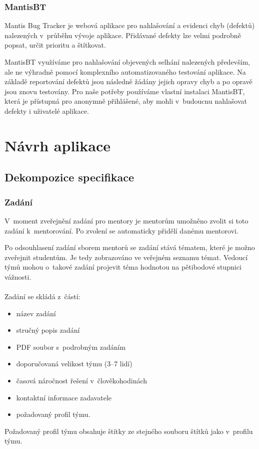 \documentclass[czech,BP]{thesiskiv}
\begin{document}
\subsection{MantisBT}
	\par Mantis Bug Tracker je webová aplikace pro nahlašování a evidenci chyb (defektů) nalezených v~průběhu vývoje aplikace. Přidávané defekty lze velmi podrobně popsat, určit prioritu a štítkovat.
	\par MantisBT využíváme pro nahlašování objevených selhání nalezených především, ale ne výhradně pomocí komplexního automatizovaného testování aplikace. Na základě reportování defektů jsou následně žádány jejich opravy chyb a po opravě jsou znovu testovány. Pro naše potřeby používáme vlastní instalaci MantisBT, která je přístupná pro anonymně přihlášené, aby mohli v~budoucnu nahlašovat defekty i uživatelé aplikace.
\chapter{Návrh aplikace}

	\section{Dekompozice specifikace}
		\subsection{Zadání}
		\par V~moment zveřejnění zadání pro mentory je mentorům umožněno zvolit si toto zadání k~mentorování. Po zvolení se automaticky přidělí danému mentorovi.
		\par Po odsouhlasení zadání sborem mentorů se zadání stává tématem, které je možno zveřejnit studentům. Je tedy zobrazováno ve veřejném seznamu témat. Vedoucí týmů mohou o~takové zadání projevit téma hodnotou na pětibodové stupnici vážnosti.\\\\
		Zadání se skládá z~částí:
		\begin{itemize}
			\item název zadání
			\item stručný popis zadání
			\item PDF soubor s~podrobným zadáním
			\item doporučovaná velikost týmu (3--7 lidí)
			\item časová náročnost řešení v~člověkohodinách
			\item kontaktní informace zadavatele
			\item požadovaný profil týmu.
		\end{itemize}
		\par Požadovaný profil týmu obsahuje štítky ze stejného souboru štítků jako v~profilu týmu.
\end{document}
